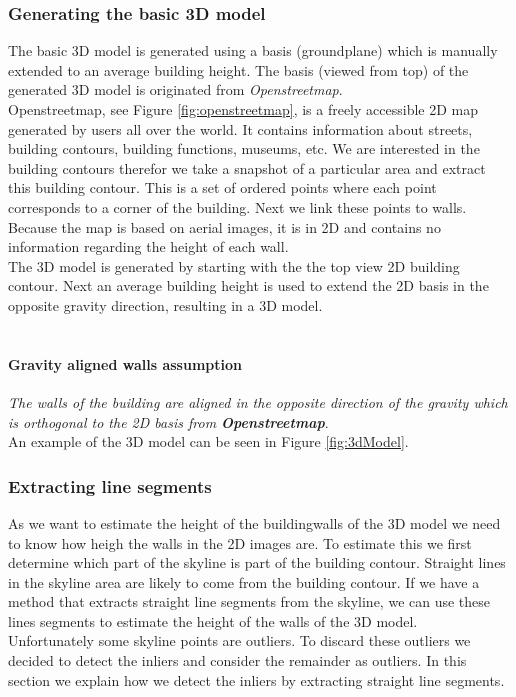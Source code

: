 \subsubsection{Generating the basic 3D model}
The basic 3D model is generated using a basis (groundplane) which is manually extended
to an average building height.  The basis (viewed from top) of the generated 3D model is originated from
\emph{Openstreetmap}.\\
Openstreetmap, see Figure \ref{fig:openstreetmap}, is a freely accessible 2D map generated by
users all over the world. It contains information about streets, building
contours, building functions, museums, etc.  We are interested in the building
contours therefor we take a snapshot of a particular area and extract this building
contour.  This is a set of ordered points where each point corresponds to a
corner of the building.  Next we link these points to walls.
Because the map is based on aerial images, it is in 2D and contains no
information regarding the height of each wall.  \\
The 3D model is generated by starting with the the top view 2D building contour.
Next an average building height is used to extend the 2D basis in the opposite gravity direction,
resulting in a 3D model.\\\\
\paragraph{Gravity aligned walls assumption}
	\emph{The walls of the building are aligned in the opposite direction of the gravity
	which is orthogonal to the 2D basis from \textbf{Openstreetmap}}.\\

An example of the 3D model can be seen in Figure
\ref{fig:3dModel}.



\subsubsection{Extracting line segments}
\label{extractinglinesegments}

	As we want to estimate the height of the buildingwalls of the 3D model we
	need to know how heigh the walls in the 2D images are.  To estimate this we
	first determine which part of the skyline is part of the building contour.
	Straight lines in the skyline area are likely to come from the building
	contour.  If we have a method that extracts straight line segments from the
	skyline, we can use these lines segments to estimate the height of the walls
	of the 3D model.\\
	Unfortunately some skyline points are outliers. To discard these outliers
	we decided to detect the inliers and consider the remainder as outliers.  In this
	section we explain how we detect the inliers by extracting straight line
	segments.  \\

